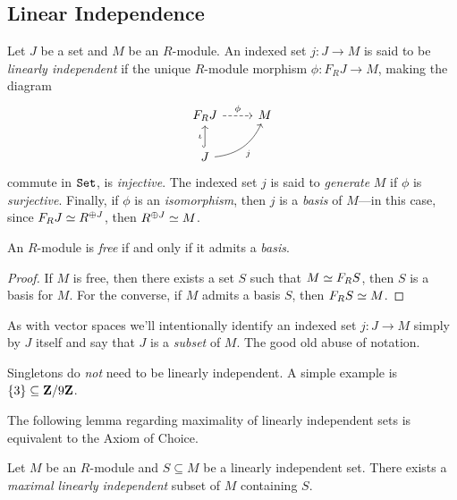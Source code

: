 \subsection{Linear Independence}

\begin{definition}
    \label{def:linear-independent-R-mod}
    Let \(J\) be a set and \(M\) be an \(R\)-module. An indexed set \(j: J \to M\)
    is said to be \emph{linearly independent} if the unique \(R\)-module morphism
    \(\phi: F_R J \to M\), making the diagram
    \[
        \begin{tikzcd}
            F_R J \ar[r, dashed, "\phi"] &M \\
            J \ar[u, hook, "\iota"] \ar[ru, bend right, "j"']
        \end{tikzcd}
    \]
    commute in \({\texttt{Set}}\), is \emph{injective}. The indexed set \(j\) is said to
    \emph{generate} \(M\) if \(\phi\) is \emph{surjective}. Finally, if \(\phi\) is
    an \emph{isomorphism}, then \(j\) is a \emph{basis} of \(M\)---in this case,
    since \(F_R J \simeq R^{\oplus J}\), then \(R^{\oplus J} \simeq M\).
\end{definition}

\begin{corollary}
    \label{cor:free-iff-basis}
    An \(R\)-module is \emph{free} if and only if it admits a \emph{basis}.
\end{corollary}

\begin{proof}
    If \(M\) is free, then there exists a set \(S\) such that \(M \simeq F_R S\), then
    \(S\) is a basis for \(M\). For the converse, if \(M\) admits a basis \(S\),
    then \(F_R S \simeq M\).
\end{proof}

As with vector spaces we'll intentionally identify an indexed set \(j: J \to M\)
simply by \(J\) itself and say that \(J\) is a \emph{subset} of \(M\). The good
old abuse of notation.

\begin{remark}[Singletons]
    \label{rem:singletons-arent-LI}
    Singletons do \emph{not} need to be linearly independent. A simple example is
    \(\{3\} \subseteq \mathbf{Z}/9\mathbf{Z}\).
\end{remark}

The following lemma regarding maximality of linearly independent sets is
equivalent to the Axiom of Choice.

\begin{lemma}[Maximality]
    \label{lem:maximal-LI-subset}
    Let \(M\) be an \(R\)-module and \(S \subseteq M\) be a linearly independent
    set. There exists a \emph{maximal linearly independent} subset of \(M\)
    containing \(S\).
\end{lemma}

